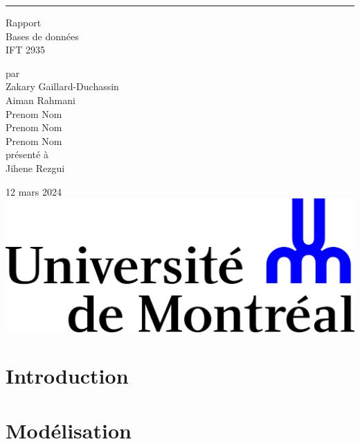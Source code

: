 \documentclass{article}
\begin{document}
\begin{titlepage}
  \centering
  
  \rule{\textwidth}{0px}
  \vspace{15mm}
  
  \Huge{Rapport} \\
  \vspace{5mm}
  \Large Bases de données \\
  IFT 2935
  
  \vspace{40mm}
  \large par \\ \vspace{3mm}
  Zakary Gaillard-Duchassin\\ \vspace{3mm}
  Aiman Rahmani \\ \vspace{3mm}
  Prenom Nom \\ \vspace{3mm}
  Prenom Nom \\ \vspace{3mm}
  Prenom Nom \\ \vspace{3mm}
  \vspace{30mm}
  présenté à \\ \vspace{3mm}
  Jihene Rezgui
  
  \vfill
  12 mars 2024 \\ \vspace{3mm}
  \includegraphics[scale=0.55]{logo-udem.png}
\end{titlepage}
\newpage

\section{Introduction}

\newpage
\section{Modélisation}
\end{document}
